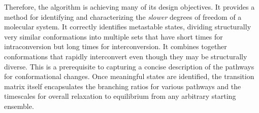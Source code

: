 Therefore, the algorithm is achieving many of its design objectives.  
It provides a method for identifying and characterizing the {\em slower} degrees of freedom of a molecular system.
It correctly identifies metastable states, dividing structurally very similar conformations into multiple sets that have short times for intraconversion but long times for interconversion.  
It combines together conformations that rapidly interconvert even though they may be structurally diverse.
This is a prerequisite to capturing a concise description of the pathways for conformational changes.  
Once meaningful states are identified, the transition matrix itself encapsulates the branching ratios for various pathways and the timescales for overall relaxation to equilibrium from any arbitrary starting ensemble.  

